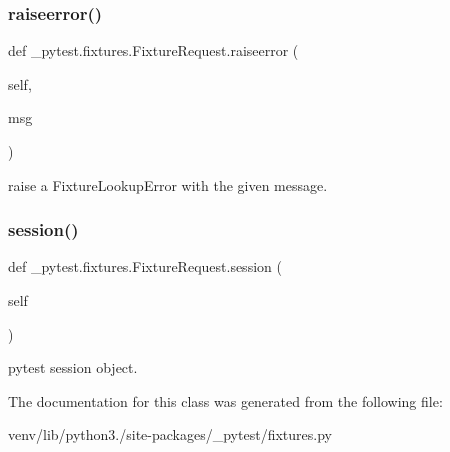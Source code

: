 \subsubsection{\texorpdfstring{raiseerror()}{raiseerror()}}
{\footnotesize\ttfamily def \+\_\+pytest.\+fixtures.\+Fixture\+Request.\+raiseerror (\begin{DoxyParamCaption}\item[{}]{self,  }\item[{}]{msg }\end{DoxyParamCaption})}

\begin{DoxyVerb}raise a FixtureLookupError with the given message. \end{DoxyVerb}
 \mbox{\label{class__pytest_1_1fixtures_1_1_fixture_request_af3d8460bd359cc34d2b086cf2fed4472}} 
\subsubsection{\texorpdfstring{session()}{session()}}
{\footnotesize\ttfamily def \+\_\+pytest.\+fixtures.\+Fixture\+Request.\+session (\begin{DoxyParamCaption}\item[{}]{self }\end{DoxyParamCaption})}

\begin{DoxyVerb}pytest session object. \end{DoxyVerb}
 

The documentation for this class was generated from the following file\+:\begin{DoxyCompactItemize}
\item 
venv/lib/python3./site-\/packages/\+\_\+pytest/fixtures.\+py\end{DoxyCompactItemize}
